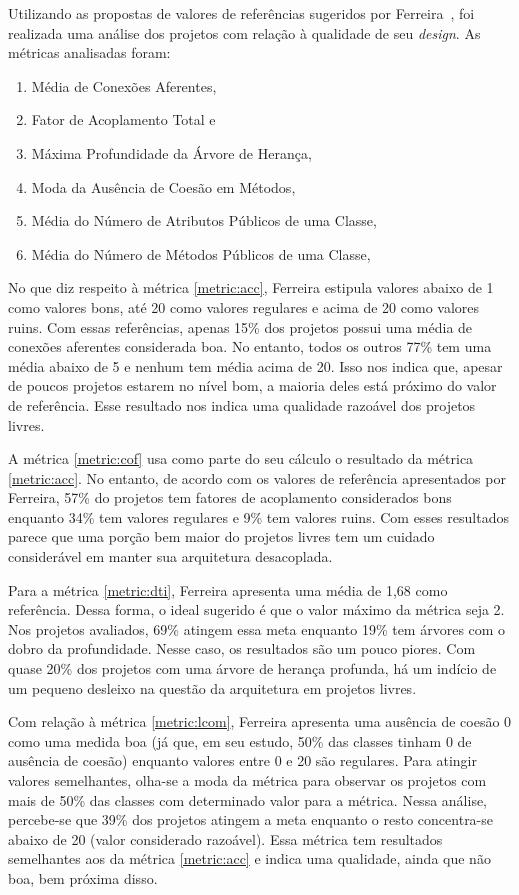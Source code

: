 Utilizando as propostas de valores de referências sugeridos por
Ferreira~\cite{Ferreira2009}, foi realizada uma análise dos projetos
com relação à qualidade de seu \textit{design}. As métricas analisadas
foram:
\begin{enumerate}
\item Média de Conexões Aferentes,
  \label{metric:acc}
\item Fator de Acoplamento Total e
  \label{metric:cof}
\item Máxima Profundidade da Árvore de Herança,
  \label{metric:dti}
\item Moda da Ausência de Coesão em Métodos,
  \label{metric:lcom}
\item Média do Número de Atributos Públicos de uma Classe,
  \label{metric:npa}
\item Média do Número de Métodos Públicos de uma Classe,
  \label{metric:npm}
\end{enumerate}

No que diz respeito à métrica \ref{metric:acc}, Ferreira estipula
valores abaixo de 1 como valores bons, até 20 como valores regulares e
acima de 20 como valores ruins. Com essas referências, apenas 15\% dos
projetos possui uma média de conexões aferentes considerada boa. No
entanto, todos os outros 77\% tem uma média abaixo de 5 e nenhum tem
média acima de 20. Isso nos indica que, apesar de poucos projetos
estarem no nível bom, a maioria deles está próximo do valor de
referência. Esse resultado nos indica uma qualidade razoável dos
projetos livres.

A métrica \ref{metric:cof} usa como parte do seu cálculo o resultado
da métrica \ref{metric:acc}. No entanto, de acordo com os valores de
referência apresentados por Ferreira, 57\% do projetos tem fatores de
acoplamento considerados bons enquanto 34\% tem valores regulares e 9\%
tem valores ruins. Com esses resultados parece que uma porção bem
maior do projetos livres tem um cuidado considerável em manter sua
arquitetura desacoplada.

Para a métrica \ref{metric:dti}, Ferreira apresenta uma média de 1,68
como referência. Dessa forma, o ideal sugerido é que o valor máximo da
métrica seja 2. Nos projetos avaliados, 69\% atingem essa meta
enquanto 19\% tem árvores com o dobro da profundidade. Nesse caso, os
resultados são um pouco piores. Com quase 20\% dos projetos com uma
árvore de herança profunda, há um indício de um pequeno desleixo na
questão da arquitetura em projetos livres.

Com relação à métrica \ref{metric:lcom}, Ferreira apresenta uma
ausência de coesão 0 como uma medida boa (já que, em seu estudo, 50\%
das classes tinham 0 de ausência de coesão) enquanto valores entre 0 e
20 são regulares. Para atingir valores semelhantes, olha-se a moda da
métrica para observar os projetos com mais de 50\% das classes com
determinado valor para a métrica. Nessa análise, percebe-se que 39\%
dos projetos atingem a meta enquanto o resto concentra-se abaixo de 20
(valor considerado razoável). Essa métrica tem resultados semelhantes
aos da métrica \ref{metric:acc} e indica uma qualidade, ainda que não
boa, bem próxima disso.

